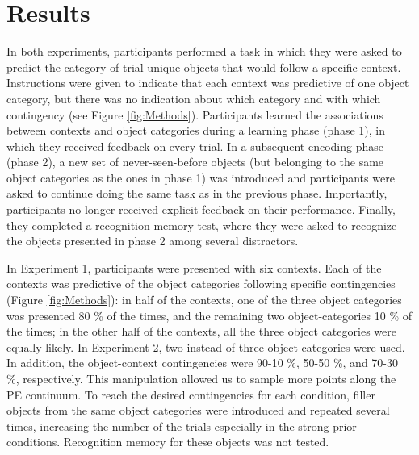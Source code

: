 \documentclass[a4paper,12pt]{article}
\begin{document}
\section{Results}
In both experiments, participants performed a task in which they were asked to predict the category of trial-unique objects that would follow a specific context. Instructions were given to indicate that each context was predictive of one object category, but there was no indication about which category and with which contingency (see Figure \ref{fig:Methods}). Participants learned the associations between contexts and object categories during a learning phase (phase 1), in which they received feedback on every trial. In a subsequent encoding phase (phase 2), a new set of never-seen-before objects (but belonging to the same object categories as the ones in phase 1) was introduced and participants were asked to continue doing the same task as in the previous phase. Importantly, participants no longer received explicit feedback on their performance. Finally, they completed a recognition memory test, where they were asked to recognize the objects presented in phase 2 among several distractors.




In Experiment 1, participants were presented with six contexts. Each of the contexts was predictive of the object categories following specific contingencies (Figure \ref{fig:Methods}): in half of the contexts, one of the three object categories was presented 80 \% of the times, and the remaining two object-categories 10 \% of the times; in the other half of the contexts, all the three object categories were equally likely. In Experiment 2, two instead of three object categories were used. In addition, the object-context contingencies were 90-10 \%, 50-50 \%, and 70-30 \%, respectively. This manipulation allowed us to sample more points along the PE continuum. To reach the desired contingencies for each condition, filler objects from the same object categories were introduced and repeated several times, increasing the number of the trials especially in the strong prior conditions. Recognition memory for these objects was not tested.
\end{document}
